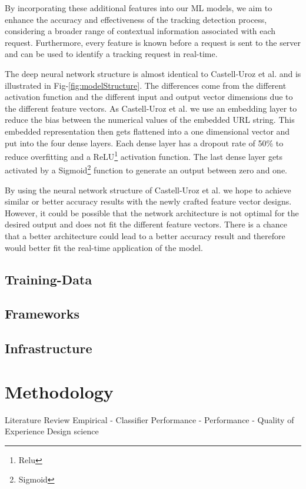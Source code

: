 By incorporating these additional features into our ML models, we aim to enhance the accuracy and effectiveness of
the tracking detection process, considering a broader range of contextual information associated with each request. 
Furthermore, every feature is known before a request is sent to the server and can be used to identify a tracking request
in real-time.

The deep neural network structure is almost identical to Castell-Uroz et al. \cite{castell2020url} and is illustrated in Fig-\ref{fig:modelStructure}.
The differences come from the different activation
function and the different input and output vector dimensions due to the different feature vectors. As Castell-Uroz et al. we use an embedding layer to reduce the bias between the numerical values of the embedded URL string. This embedded 
representation then gets flattened into a one dimensional vector and put into the four dense layers. Each dense layer has a dropout rate of 50\% to reduce
overfitting and a ReLU\footnote{Relu} activation function. The last dense layer gets activated by a Sigmoid\footnote{Sigmoid} function to generate an output
between zero and one.

By using the neural network structure of Castell-Uroz et al. we hope to achieve similar or better accuracy results with 
the newly crafted feature vector designs. However, it could be possible that the network architecture is not optimal
for the desired output and does not fit the different feature vectors. There is a chance that a better architecture could 
lead to a better accuracy result and therefore would better fit the real-time application of the model.



\subsection{Training-Data}
\subsection{Frameworks}
\subsection{Infrastructure}
\section{Methodology}
Literature Review
Empirical
- Classifier Performance
- Performance
- Quality of Experience
Design science







